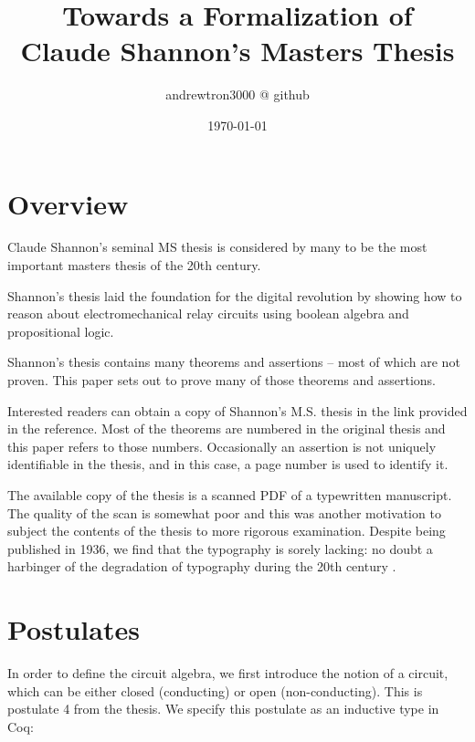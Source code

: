 \documentclass[11pt,twocolumn]{article}
\title{Towards a Formalization of \\ Claude Shannon's Masters Thesis}
\author{andrewtron3000 @ github}
\date{\today}
\begin{document}
\maketitle
\begin{abstract}

\end{abstract}
\begin{coqdoccode}
\coqdocemptyline
\end{coqdoccode}
\section{Overview}





Claude Shannon's seminal MS thesis \cite{shannon40} is considered by
many to be the most important masters thesis of the 20th century.


Shannon's thesis laid the foundation for the digital revolution by
showing how to reason about electromechanical relay circuits using
boolean algebra and propositional logic.


Shannon's thesis contains many theorems and assertions -- most of
which are not proven.  This paper sets out to prove many of those
theorems and assertions.


Interested readers can obtain a copy of Shannon's M.S. thesis in the
link provided in the reference.  Most of the theorems are numbered in
the original thesis and this paper refers to those numbers.
Occasionally an assertion is not uniquely identifiable in the thesis,
and in this case, a page number is used to identify it.


The available copy of the thesis is a scanned PDF of a typewritten
manuscript.  The quality of the scan is somewhat poor and this was
another motivation to subject the contents of the thesis to more
rigorous examination.  Despite being published in 1936, we find that
the typography is sorely lacking: no doubt a harbinger of the
degradation of typography during the 20th century \cite{qnuth07}.




\section{Postulates}





In order to define the circuit algebra, we first introduce the notion
of a circuit, which can be either closed (conducting) or open
(non-conducting).  This is postulate 4 from the thesis.  We specify
this postulate as an inductive type in Coq:
\end{document}

